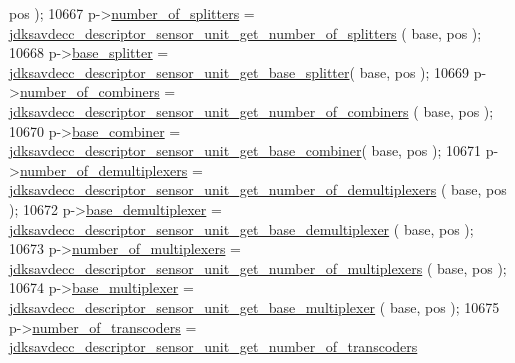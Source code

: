 \begin{DoxyCode}
      pos );
10667         p->\hyperlink{structjdksavdecc__descriptor__sensor__unit_a3b40548ad0ea8b330660dcee0de42db7}{number\_of\_splitters} = 
      \hyperlink{group__descriptor__sensor_gacf2972bedf41780f04bd0768c3f3a49f}{jdksavdecc\_descriptor\_sensor\_unit\_get\_number\_of\_splitters}
      ( base, pos );
10668         p->\hyperlink{structjdksavdecc__descriptor__sensor__unit_a7a10a93a209406b90273d791f69a4421}{base\_splitter} = 
      \hyperlink{group__descriptor__sensor_gafe54c81caeb3bf82ad72f462f4b2d8a7}{jdksavdecc\_descriptor\_sensor\_unit\_get\_base\_splitter}( 
      base, pos );
10669         p->\hyperlink{structjdksavdecc__descriptor__sensor__unit_afbc32f9432e80e58a019b1be2388cf66}{number\_of\_combiners} = 
      \hyperlink{group__descriptor__sensor_ga98a697927790b02616b74ca032255361}{jdksavdecc\_descriptor\_sensor\_unit\_get\_number\_of\_combiners}
      ( base, pos );
10670         p->\hyperlink{structjdksavdecc__descriptor__sensor__unit_afeae9980c36b3e99f2e4b8ab2c31e9d5}{base\_combiner} = 
      \hyperlink{group__descriptor__sensor_ga7edab4d075ad5b612ee5bb7013d329bd}{jdksavdecc\_descriptor\_sensor\_unit\_get\_base\_combiner}( 
      base, pos );
10671         p->\hyperlink{structjdksavdecc__descriptor__sensor__unit_ae2ee0d16f100be7e14722eaffcc600b4}{number\_of\_demultiplexers} = 
      \hyperlink{group__descriptor__sensor_ga3764008e0e0150df4b81cee3b5d2482e}{jdksavdecc\_descriptor\_sensor\_unit\_get\_number\_of\_demultiplexers}
      ( base, pos );
10672         p->\hyperlink{structjdksavdecc__descriptor__sensor__unit_a36901b5833f03ae7be92b52745b3054c}{base\_demultiplexer} = 
      \hyperlink{group__descriptor__sensor_ga95f02c446b7f305e03d5c82e5259e360}{jdksavdecc\_descriptor\_sensor\_unit\_get\_base\_demultiplexer}
      ( base, pos );
10673         p->\hyperlink{structjdksavdecc__descriptor__sensor__unit_aa2bffcf80dd2b162cce9a335ef515165}{number\_of\_multiplexers} = 
      \hyperlink{group__descriptor__sensor_ga3771fa5df1f3944f26d1ea25018aca52}{jdksavdecc\_descriptor\_sensor\_unit\_get\_number\_of\_multiplexers}
      ( base, pos );
10674         p->\hyperlink{structjdksavdecc__descriptor__sensor__unit_a3e13f295f26afe3335587c18790c7dda}{base\_multiplexer} = 
      \hyperlink{group__descriptor__sensor_ga5425485c446ab6df5c5dd42afc58d4e2}{jdksavdecc\_descriptor\_sensor\_unit\_get\_base\_multiplexer}
      ( base, pos );
10675         p->\hyperlink{structjdksavdecc__descriptor__sensor__unit_ad9030c572f8891febbc6108f96772835}{number\_of\_transcoders} = 
      \hyperlink{group__descriptor__sensor_gaefa2ca197d1fd3788d54c0ecee03dacd}{jdksavdecc\_descriptor\_sensor\_unit\_get\_number\_of\_transcoders}

\end{DoxyCode}
